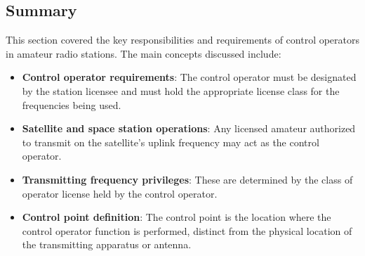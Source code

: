 
\subsection*{Summary}
This section covered the key responsibilities and requirements of control operators in amateur radio stations. The main concepts discussed include:
\begin{itemize}
    \item \textbf{Control operator requirements}: The control operator must be designated by the station licensee and must hold the appropriate license class for the frequencies being used.
    \item \textbf{Satellite and space station operations}: Any licensed amateur authorized to transmit on the satellite's uplink frequency may act as the control operator.
    \item \textbf{Transmitting frequency privileges}: These are determined by the class of operator license held by the control operator.
    \item \textbf{Control point definition}: The control point is the location where the control operator function is performed, distinct from the physical location of the transmitting apparatus or antenna.
\end{itemize}
